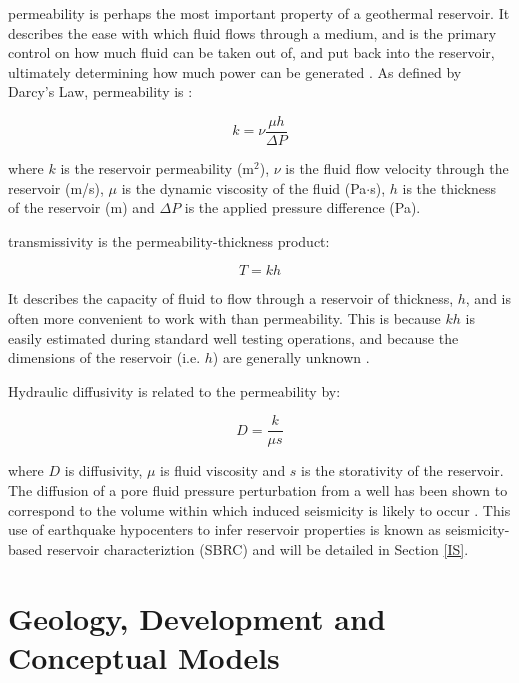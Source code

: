 \Gls{permeability} is perhaps the most important property of a geothermal reservoir. It describes the ease with which fluid flows through a medium, and is the primary control on how much fluid can be taken out of, and put back into the reservoir, ultimately determining how much power can be generated \citep{Grant_2011}. As defined by Darcy's Law, \gls{permeability} is \citep{DiPippo_2016}:

\begin{equation}
k = \nu\frac{\mu{h}}{\Delta{P}}
\end{equation}

where $k$ is the reservoir \gls{permeability} (m$^2$), $\nu$ is the fluid flow velocity through the reservoir (m/s), $\mu$ is the dynamic viscosity of the fluid (Pa$\cdot$s), $h$ is the thickness of the reservoir (m) and $\Delta{P}$ is the applied pressure difference (Pa).

\Gls{transmissivity} is the \gls{permeability}-thickness product:

\begin{equation}
T = kh
\end{equation}

It describes the capacity of fluid to flow through a reservoir of thickness, $h$, and is often more convenient to work with than \gls{permeability}. This is because $kh$ is easily estimated during standard well testing operations, and because the dimensions of the reservoir (i.e. $h$) are generally unknown \citep{horne1995modern}.

Hydraulic \gls{diffusivity} is related to the \gls{permeability} by:

\begin{equation}
D = \frac{k}{\mu{s}}
\end{equation}

where $D$ is \gls{diffusivity}, $\mu$ is fluid viscosity and $s$ is the storativity of the reservoir. The diffusion of a pore fluid pressure perturbation from a well has been shown to correspond to the volume within which induced seismicity is likely to occur \citep[e.g.][]{Shapiro_2002,Parotidis_2004,Shapiro_2009,Shapiro_1997,Jeanne_2014}. This use of earthquake hypocenters to infer reservoir properties is known as seismicity-based reservoir characteriztion (SBRC) \citep{Shapiro_2002} and will be detailed in Section \ref{IS}.

\section{Geology, Development and Conceptual Models}
